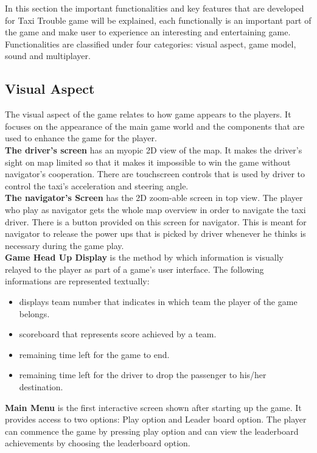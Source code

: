 In this section the important functionalities and key features that are developed for Taxi Trouble game  will be explained, each functionally is an important part of the game and make user to experience an interesting and entertaining game. Functionalities are classified under four categories: visual aspect, game model, sound and multiplayer. 

\subsection*{Visual Aspect} %
\label{sub:visual_aspect}
The visual aspect of the game relates to how game appears to the players. It focuses on the appearance of the main game world and the components that are used to enhance the game for the player. \\

\textbf{The driver's screen }has an myopic 2D view of the map. It makes the driver's sight on map limited so that it makes it impossible to win the game without navigator's cooperation. There are touchscreen controls that is used by driver to control the taxi's acceleration and steering angle.\\   

\textbf{The navigator's Screen }has the 2D zoom-able screen in top view. The player who play as navigator gets the whole map overview in order to navigate the taxi driver. There is a button provided on this screen for navigator. This is  meant for navigator to release the power ups that is picked by driver whenever he thinks is necessary during the game play.\\

\textbf{Game Head Up Display }is the method by which information is visually relayed to the player as part of a game's user interface.  The following informations are represented textually:
			\begin{itemize}
				\item displays team number that indicates in which team the player of the game belongs. 
				\item scoreboard that represents score achieved by a team. 
				\item remaining time left for the game to end.  
				\item remaining time left for the driver to drop the passenger to his/her destination. 
			\end{itemize}	

\textbf{ Main Menu }is the first interactive screen shown after starting up the game. It provides access to two options: Play option and Leader board option. The player can commence the game by pressing play option and can view the leaderboard achievements by choosing the leaderboard option.\\

